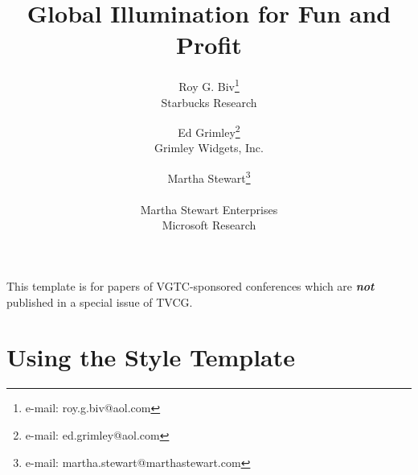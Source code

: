 \documentclass{vgtc}                          %
\title{Global Illumination for Fun and Profit}
\author{Roy G. Biv\thanks{e-mail: roy.g.biv@aol.com}\\ %
        \scriptsize Starbucks Research %
\and Ed Grimley\thanks{e-mail: ed.grimley@aol.com}\\ %
     \scriptsize Grimley Widgets, Inc. %
\and Martha Stewart\thanks{e-mail: martha.stewart@marthastewart.com}\\ %
     \parbox{1.4in}{\scriptsize \centering Martha Stewart Enterprises \\ Microsoft Research}}
\begin{document}


\maketitle

This template is for papers of VGTC-sponsored conferences which are \emph{\textbf{not}} published in a special issue of TVCG.

\section{Using the Style Template}
\end{document}
